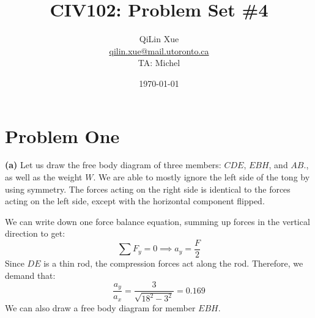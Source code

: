 \documentclass{article}
\title{CIV102: Problem Set \#4}
\author{QiLin Xue \\ \href{mailto:qilin.xue@mail.utoronto.ca}{qilin.xue@mail.utoronto.ca} \\ TA: Michel}
\date{\today}
\begin{document}
\maketitle
\section{Problem One}
\textbf{(a)} Let us draw the free body diagram of three members: $CDE$, $EBH$, and $AB$., as well as the weight $W$. We are able to mostly ignore the left side of the tong by using symmetry. The forces acting on the right side is identical to the forces acting on the left side, except with the horizontal component flipped.
\begin{center}
\end{center}
We can write down one force balance equation, summing up forces in the vertical direction to get:
\begin{equation}
    \sum F_y = 0 \implies a_y=\frac{F}{2}
    \label{eq:eq1}
\end{equation}
Since $DE$ is a thin rod, the compression forces act along the rod. Therefore, we demand that:
\begin{equation}
    \frac{a_y}{a_x}=\frac{3}{\sqrt{18^2-3^2}}=0.169
    \label{eq:2}
\end{equation}
We can also draw a free body diagram for member $EBH$.
\end{document}
